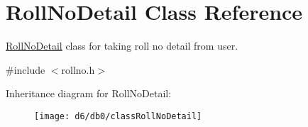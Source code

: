 \hypertarget{classRollNoDetail}{\section{\-Roll\-No\-Detail \-Class \-Reference}
\label{d6/db0/classRollNoDetail}
}


\hyperlink{classRollNoDetail}{\-Roll\-No\-Detail} class for taking roll no detail from user.  




{\ttfamily \#include $<$rollno.\-h$>$}

\-Inheritance diagram for \-Roll\-No\-Detail\-:\begin{figure}[H]
\begin{center}
\leavevmode
\texttt{[image: d6/db0/classRollNoDetail]}
\end{center}
\end{figure}
